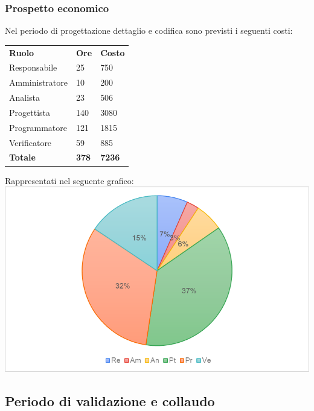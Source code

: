 \subsubsection{Prospetto economico}
Nel periodo di progettazione dettaglio e codifica sono previsti i seguenti costi:
\begin{longtable} {
		>{}p{32mm}
		>{}p{20mm}
		>{}p{20mm}
	}
	\rowcolor{gray!50}
	
	\textbf{Ruolo} & \textbf{Ore} & \textbf{Costo} \TBstrut \\
	Responsabile & 25 & 750 \TBstrut \\
	Amministratore & 10 & 200 \TBstrut \\
	Analista & 23 & 506 \TBstrut \\
	Progettista & 140 & 3080 \TBstrut \\
	Programmatore & 121 & 1815 \TBstrut \\
	Verificatore & 59 & 885 \TBstrut \\
	\textbf{Totale} & \textbf{378}& \textbf{7236} \TBstrut \\		
\end{longtable}
Rappresentati nel seguente grafico: \\
\includegraphics[width=\linewidth]{./img/Grafici/6.png}

\subsection{Periodo di validazione e collaudo}
